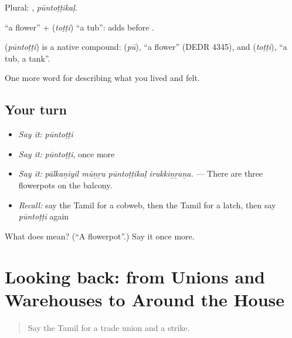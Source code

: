 Plural: , \emph{pūntoṭṭikaḷ}.

 \textquotedblleft{}a flower\textquotedblright{} +  (\emph{toṭṭi}) \textquotedblleft{}a tub\textquotedblright{}:  adds  before .

\begin{cousinweb}
\textbf{} (\emph{pūntoṭṭi}) is a native compound:  (\emph{pū}), \textquotedblleft{}a flower\textquotedblright{} (DEDR 4345), and  (\emph{toṭṭi}), \textquotedblleft{}a tub, a tank\textquotedblright{}.
\end{cousinweb}

\begin{grammarlens}[title={What you've built}]
One more word for describing what you lived and felt.
\end{grammarlens}

\subsection*{Your turn}
\begin{itemize}
\raggedright
  \item \emph{Say it:} \emph{pūntoṭṭi}
  \item \emph{Say it:} \emph{pūntoṭṭi}, once more
  \item \emph{Say it:} \emph{pālkaṉiyil mūṉṟu pūntoṭṭikaḷ irukkiṉṟaṉa.} — There are three flowerpots on the balcony.
  \item \emph{Recall:} say the Tamil for a cobweb, then the Tamil for a latch, then say \emph{pūntoṭṭi} again
\end{itemize}

\begin{tcolorbox}[breakable,colback=teal!4,colframe=teal!35!black,title={Before you move on}]
What does  mean? (\textquotedblleft{}A flowerpot\textquotedblright{}.) Say it once more.
\end{tcolorbox}
\section[(dialogue)]{Looking back: from Unions and Warehouses to Around the House}

\label{lesson:TA-R521-review-514-521}



\begin{quote}
Say the Tamil for a trade union and a strike.
\end{quote}

